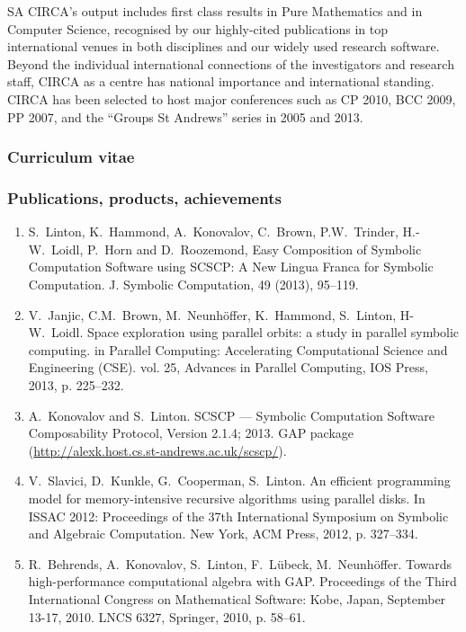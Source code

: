 \begin{sitedescription}{SA}
CIRCA's output includes first class results in Pure Mathematics and in
Computer Science, recognised by our highly-cited publications in top
international venues in both disciplines and our widely used research
software. Beyond the individual international connections of the 
investigators and research staff, CIRCA as a centre has national 
importance and international standing. CIRCA has been selected to host 
major conferences such as CP 2010, BCC 2009, PP 2007, and the 
``Groups St Andrews'' series in 2005 and 2013.


\subsubsection*{Curriculum vitae}





%


\subsubsection*{Publications, products, achievements}

\begin{enumerate}
\item 
S.~Linton, K.~Hammond, A.~Konovalov, C.~Brown, P.W.~Trinder, H.-W.~Loidl, 
P.~Horn and D.~Roozemond, Easy Composition of Symbolic Computation Software using 
SCSCP: A New Lingua Franca for Symbolic Computation.
J. Symbolic Computation, 49 (2013), 95--119.
\item
V.~Janjic, C.M.~Brown, M.~Neunh{\"o}ffer, K.~Hammond, S.~Linton, H-W.~Loidl. 
Space exploration using parallel orbits: a study in parallel symbolic computing.
in Parallel Computing: Accelerating Computational Science and Engineering (CSE). 
vol. 25, Advances in Parallel Computing, IOS Press, 2013, p. 225--232.
\item 
A.~Konovalov and S.~Linton. 
SCSCP --- Symbolic Computation Software Composability Protocol, 
Version 2.1.4; 2013. GAP package (\url{http://alexk.host.cs.st-andrews.ac.uk/scscp/}).
\item
V.~Slavici, D.~Kunkle, G.~Cooperman, S.~Linton. 
An efficient programming model for memory-intensive recursive 
algorithms using parallel disks. In ISSAC 2012: Proceedings of 
the 37th International Symposium on Symbolic and Algebraic Computation. 
New York, ACM Press, 2012, p. 327--334.
\item 
R.~Behrends, A.~Konovalov, S.~Linton, F.~L{\"u}beck, M.~Neunh{\"o}ffer.
Towards high-performance computational algebra with GAP.
Proceedings of the Third International Congress on Mathematical Software: 
Kobe, Japan, September 13-17, 2010. LNCS 6327, Springer, 2010, p. 58--61.


\end{enumerate}
\end{sitedescription}
